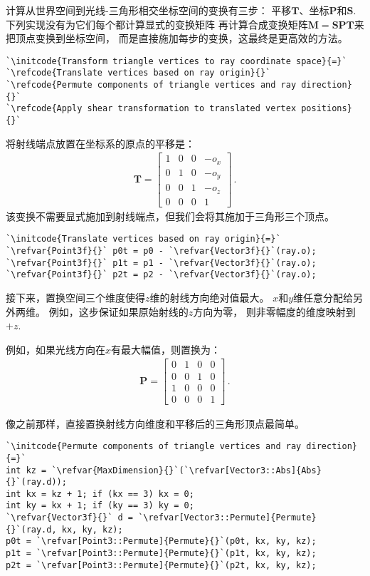 计算从世界空间到光线-三角形相交坐标空间的变换有三步：
平移$\bm T$、坐标$\bm P$和$\bm S$.
下列实现没有为它们每个都计算显式的变换矩阵
再计算合成变换矩阵$\bm M=\bm S\bm P\bm T$来把顶点变换到坐标空间，
而是直接施加每步的变换，这最终是更高效的方法。
\begin{lstlisting}
`\initcode{Transform triangle vertices to ray coordinate space}{=}`
`\refcode{Translate vertices based on ray origin}{}`
`\refcode{Permute components of triangle vertices and ray direction}{}`
`\refcode{Apply shear transformation to translated vertex positions}{}`
\end{lstlisting}

将射线端点放置在坐标系的原点的平移是：
\begin{align*}
    \bm T=\left[\begin{array}{cccc}
            1 & 0 & 0 & -o_x \\
            0 & 1 & 0 & -o_y \\
            0 & 0 & 1 & -o_z \\
            0 & 0 & 0 & 1
        \end{array}\right]\, .
\end{align*}
该变换不需要显式施加到射线端点，但我们会将其施加于三角形三个顶点。
\begin{lstlisting}
`\initcode{Translate vertices based on ray origin}{=}`
`\refvar{Point3f}{}` p0t = p0 - `\refvar{Vector3f}{}`(ray.o);
`\refvar{Point3f}{}` p1t = p1 - `\refvar{Vector3f}{}`(ray.o);
`\refvar{Point3f}{}` p2t = p2 - `\refvar{Vector3f}{}`(ray.o);
\end{lstlisting}

接下来，置换空间三个维度使得$z$维的射线方向绝对值最大。
$x$和$y$维任意分配给另外两维。
例如，这步保证如果原始射线的$z$方向为零，
则非零幅度的维度映射到$+z$.

例如，如果光线方向在$x$有最大幅值，则置换为：
\begin{align*}
    \bm P=\left[\begin{array}{cccc}
            0 & 1 & 0 & 0 \\
            0 & 0 & 1 & 0 \\
            1 & 0 & 0 & 0 \\
            0 & 0 & 0 & 1
        \end{array}\right]\, .
\end{align*}

像之前那样，直接置换射线方向维度和平移后的三角形顶点最简单。
\begin{lstlisting}
`\initcode{Permute components of triangle vertices and ray direction}{=}`
int kz = `\refvar{MaxDimension}{}`(`\refvar[Vector3::Abs]{Abs}{}`(ray.d));
int kx = kz + 1; if (kx == 3) kx = 0;
int ky = kx + 1; if (ky == 3) ky = 0;
`\refvar{Vector3f}{}` d = `\refvar[Vector3::Permute]{Permute}{}`(ray.d, kx, ky, kz);
p0t = `\refvar[Point3::Permute]{Permute}{}`(p0t, kx, ky, kz);
p1t = `\refvar[Point3::Permute]{Permute}{}`(p1t, kx, ky, kz);
p2t = `\refvar[Point3::Permute]{Permute}{}`(p2t, kx, ky, kz);
\end{lstlisting}

